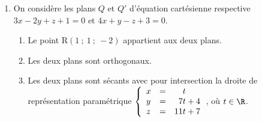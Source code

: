 \begin{enumerate}
\item On considère les plans $Q$ et $Q'$ d'équation cartésienne respective $3x - 2y + z + 1 = 0$ et $4x + y - z + 3 = 0$.
	\begin{enumerate}
		\item Le point R$(1~;~1~;~-2)$ appartient aux deux plans.
		\item Les deux plans sont orthogonaux.
		\item Les deux plans sont sécants avec pour intersection la droite de représentation
paramétrique $\left\{\begin{array}{l c l}
x&=& \phantom{17}t\\
y& =& \phantom{1}7t + 4 \\
z& =& 11t + 7
\end{array}\right.$, où $t \in \R$.
		\end{enumerate}
\end{enumerate}

\vspace{0,5cm}
